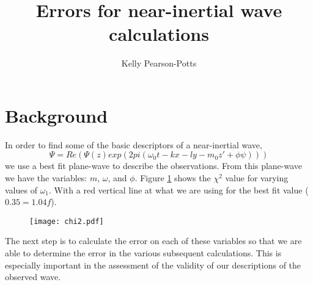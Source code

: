 \documentclass[preprint,12pt]{elsarticle}
\begin{document}
\begin{frontmatter}


\title{Errors for near-inertial wave calculations}




\author{Kelly Pearson-Potts}

\address{Hawaii, United States}

\begin{abstract}

\end{abstract}

\end{frontmatter}

\linenumbers
\onehalfspacing
\section{Background}
In order to find some of the basic descriptors of a near-inertial wave, 
\begin{equation}
\Psi = Re(\Psi(z) exp(2pi(\omega_0t-kx-ly-m_0z'+\phi\psi)))
\end{equation}
we use a best fit plane-wave to describe the observations.  From this plane-wave we have the variables: $m$, $\omega$, and $\phi$.  Figure \ref{fig:chi2} shows the $\chi^2$ value for varying values of $\omega_1$.  With a red vertical line at what we are using for the best fit value ($0.35=1.04f$).  
\begin{figure}[h]
    \centering
    \texttt{[image: chi2.pdf]}
    \caption{}
    \label{fig:chi2}
\end{figure}
The next step is to calculate the error on each of these variables so that we are able to determine the error in the various subsequent calculations.  This is especially important in the assessment of the validity of our descriptions of the observed wave.
\end{document}
